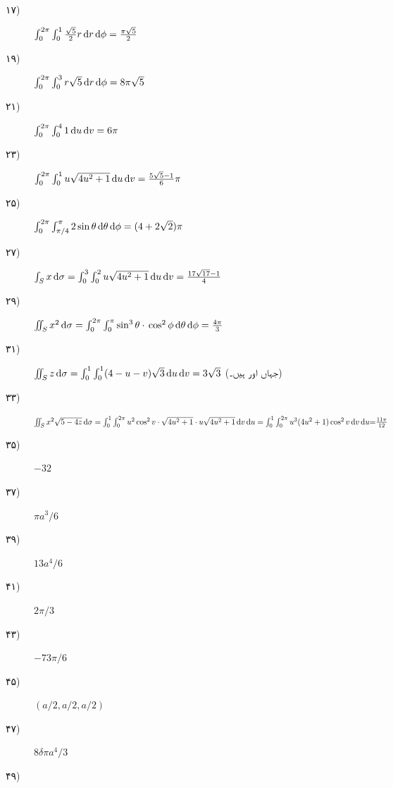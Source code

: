 \begin {description}
\item [
\protect ۱۷)
]
 \(\int _0^{2\pi }\int _0^1\tfrac {\sqrt {5}}{2}r\dif r\dif \phi =\tfrac {\pi \sqrt {5}}{2}\) 
\item [
\protect ۱۹)
]
 \(\int _0^{2\pi }\int _0^3 r\sqrt {5}\dif r\dif \phi =8\pi \sqrt {5}\) 
\item [
\protect ۲۱)
]
 \(\int _0^{2\pi }\int _0^4 1\dif u\dif v=6\pi \) 
\item [
\protect ۲۳)
]
 \(\int _0^{2\pi }\int _0^1u\sqrt {4u^2+1}\dif u\dif v=\tfrac {5\sqrt {5}-1}{6}\pi \) 
\item [
\protect ۲۵)
]
 \(\int _0^{2\pi }\int _{\pi /4}^{\pi } 2\sin \theta \dif \theta \dif \phi =(4+2\sqrt {2})\pi \) 
\item [
\protect ۲۷)
]
 \(\int _S x\dif \sigma =\int _0^3\int _0^2 u\sqrt {4u^2+1}\dif u\dif v=\tfrac {17\sqrt {17}-1}{4}\) 
\item [
\protect ۲۹)
]
 \(\iint _S x^2\dif \sigma =\int _0^{2\pi }\int _0^{\pi } \sin ^3\theta \cdot \\ \cos ^2\phi \dif \theta \dif \phi =\tfrac {4\pi }{3}\) 
\item [
\protect ۳۱)
]
 \(\iint _S z\dif \sigma =\int _0^{1}\int _0^{1}(4-u-v)\sqrt {3}\dif u\dif v\\ =3\sqrt {3} \) (جہاں  اور  ہیں۔) 
\item [
\protect ۳۳)
]
 \(\iint _S x^2\sqrt {5-4z}\dif \sigma =\int _0^{1}\int _0^{2\pi }u^2\cos ^2 v\cdot \sqrt {4u^2+1}\cdot u\sqrt {4u^2+1} \dif v\dif u=\int _0^1\int _0^{2\pi }u^3(4u^2+1)\cos ^2 v\dif v\dif u{=}\tfrac {11\pi }{12} \) 
\item [
\protect ۳۵)
]
 \( -32\) 
\item [
\protect ۳۷)
]
 \( \pi a^3\!/\!6\) 
\item [
\protect ۳۹)
]
 \( 13a^4\!/\!6\) 
\item [
\protect ۴۱)
]
 \( 2\pi \!/\!3\) 
\item [
\protect ۴۳)
]
 \( -73\pi \!/\!6\) 
\item [
\protect ۴۵)
]
 \( (a\!/\!2,a\!/\!2,a\!/\!2)\) 
\item [
\protect ۴۷)
]
 \( 8\delta \pi a^4\!/\!3\) 
\item [
\protect ۴۹)
]
 \begin {minipage}{0.35\textwidth } \centering {} \end {minipage} 

\end{description}
